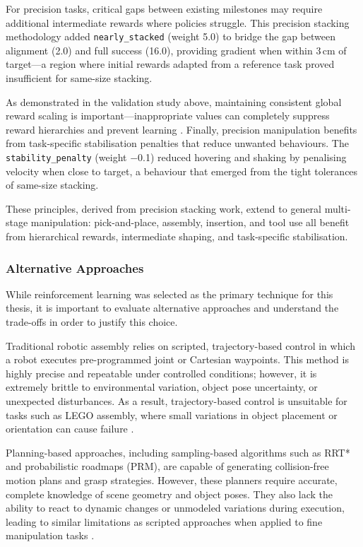 \documentclass[12pt,a4paper,oneside]{report}
\begin{document}
For precision tasks, critical gaps between existing milestones may require additional intermediate rewards where policies struggle. This precision stacking methodology added \texttt{nearly\_stacked} (weight 5.0) to bridge the gap between alignment (2.0) and full success (16.0), providing gradient when within 3\,cm of target---a region where initial rewards adapted from a reference task \cite{makoviychukIsaacGymHigh2021b} proved insufficient for same-size stacking.

As demonstrated in the validation study above, maintaining consistent global reward scaling is important---inappropriate values can completely suppress reward hierarchies and prevent learning \cite{schulmanProximalPolicyOptimization2017}. Finally, precision manipulation benefits from task-specific stabilisation penalties that reduce unwanted behaviours. The \texttt{stability\_penalty} (weight $-$0.1) reduced hovering and shaking by penalising velocity when close to target, a behaviour that emerged from the tight tolerances of same-size stacking.

These principles, derived from precision stacking work, extend to general multi-stage manipulation: pick-and-place, assembly, insertion, and tool use all benefit from hierarchical rewards, intermediate shaping, and task-specific stabilisation.


\subsubsection{Alternative Approaches}
While reinforcement learning was selected as the primary technique for this thesis, it is important to evaluate alternative approaches and understand the trade-offs in order to justify this choice.

Traditional robotic assembly relies on scripted, trajectory-based control in which a robot executes pre-programmed joint or Cartesian waypoints. This method is highly precise and repeatable under controlled conditions; however, it is extremely brittle to environmental variation, object pose uncertainty, or unexpected disturbances. As a result, trajectory-based control is unsuitable for tasks such as LEGO assembly, where small variations in object placement or orientation can cause failure \cite{chengZeroshotSimtorealTransfer2023}. 

Planning-based approaches, including sampling-based algorithms such as RRT* and probabilistic roadmaps (PRM), are capable of generating collision-free motion plans and grasp strategies. However, these planners require accurate, complete knowledge of scene geometry and object poses. They also lack the ability to react to dynamic changes or unmodeled variations during execution, leading to similar limitations as scripted approaches when applied to fine manipulation tasks \cite{chengZeroshotSimtorealTransfer2023}. 
\end{document}
